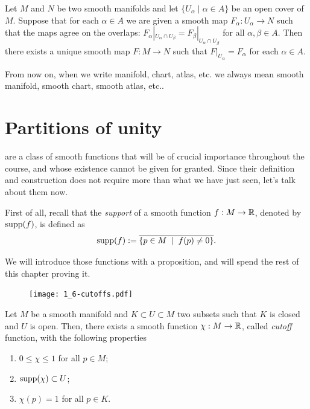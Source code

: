 \begin{proposition}
  Let $M$ and $N$ be two smooth manifolds and let $\{U_\alpha\mid\alpha\in A\}$ be an open cover of $M$.
  Suppose that for each $\alpha\in A$ we are given a smooth map $F_
  \alpha:U_\alpha\to N$ such that the maps agree on the overlaps: $F_\alpha|_{U_\alpha\cap U_\beta} = F_\beta|_{U_\alpha\cap U_\beta}$ for all $\alpha,\beta\in A$. 
  Then there exists a unique smooth map $F:M\to N$ such that $F|_{U_\alpha} = F_\alpha$ for each $\alpha\in A$.
\end{proposition}

\begin{tcolorbox}
From now on, when we write manifold, chart, atlas, etc. we always mean smooth manifold, smooth chart, smooth atlas, etc..
\end{tcolorbox}

\section{Partitions of unity}

 are a class of smooth functions that will be of crucial importance throughout the course, and whose existence cannot be given for granted.
Since their definition and construction does not require more than what we have just seen, let's talk about them now.

First of all, recall that the \emph{support} of a smooth function $f: M \to \mathbb{R}$, denoted by $\operatorname{supp}(f)$, is defined as
\begin{equation}
  \operatorname{supp}(f) := \overline{\{ p\in M \;\mid\; f(p) \neq 0\}}.
\end{equation}

We will introduce those functions with a proposition, and will spend the rest of this chapter proving it.

\begin{figure}[htp!]
  \texttt{[image: 1\_6-cutoffs.pdf]}
\end{figure}

\begin{proposition}\label{prop:cutoff}
  Let $M$ be a smooth manifold and $K\subset U\subset M$ two subsets such that $K$ is closed and $U$ is open.
  Then, there exists a smooth function $\chi: M \to\mathbb{R}$, called \emph{cutoff} function, with the following properties
  \begin{enumerate}
    \item $0 \leq \chi \leq 1$ for all $p\in M$;
    \item $\operatorname{supp}(\chi)\subset U$;
    \item $\chi(p) = 1$ for all $p\in K$.
  \end{enumerate}
\end{proposition}

